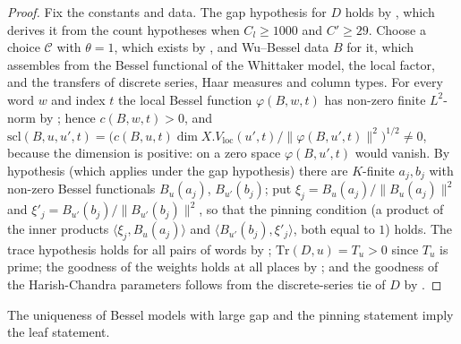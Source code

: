 \begin{proof}
Fix the constants and data. The gap hypothesis for $D$ holds by
, which derives it from the count hypotheses when $C_l\ge1000$
and $C'\ge29$. Choose a choice $\mathcal C$ with $\theta=1$, which exists by , and
Wu--Bessel data $B$ for it, which  assembles from the Bessel functional of the
Whittaker model, the local factor, and the transfers of discrete series, Haar measures and column types. For every word $w$
and index $t$ the local Bessel function $\varphi(B,w,t)$ has non-zero finite $L^2$-norm by
; hence $c(B,w,t)>0$, and
$\mathrm{scl}(B,u,u',t)=\bigl(c(B,u,t)\dim X.V_{\mathrm{loc}}(u',t)/\|\varphi(B,u',t)\|^2\bigr)^{1/2}\ne0$, because the dimension
is positive: on a zero space $\varphi(B,u',t)$ would vanish. By hypothesis (which applies under the gap hypothesis) there are
$K$-finite $a_j,b_j$ with non-zero Bessel functionals $B_u(a_j)$, $B_{u'}(b_j)$; put $\xi_j=B_u(a_j)/\|B_u(a_j)\|^2$ and
$\xi'_j=B_{u'}(b_j)/\|B_{u'}(b_j)\|^2$, so that the pinning condition (a product of the inner products
$\langle\xi_j,B_u(a_j)\rangle$ and $\langle B_{u'}(b_j),\xi'_j\rangle$, both equal to $1$) holds. The trace hypothesis holds
for all pairs of words by ; $\mathrm{Tr}(D,u)=T_u>0$
since $T_u$ is prime; the goodness of the weights holds at all places by ;
and the goodness of the Harish-Chandra parameters follows from the discrete-series tie of $D$ by
.
\end{proof}

\begin{proposition}[Leaves]\label{pf:thmS-carrier:xleaves}
The uniqueness of Bessel models with large gap and the pinning statement imply the leaf statement.
\end{proposition}

